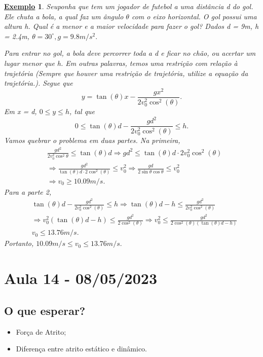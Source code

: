 \documentclass{article}
\newtheorem{example}{\underline{Exemplo}}
\begin{document}
\begin{example}
  Seuponha que tem um jogador de futebol a uma dist\^ancia d do gol. Ele chuta a bola, a qual faz um \^angulo $\theta $ com o 
eixo horizontal. O gol possui uma altura h. Qual \'e a menor e a maior velocidade para fazer o gol? Dados d = 9m, h = 2.4m, $\theta =30^{\circ}, g=9.8m/s^{2}.$

  Para entrar no gol, a bola deve percorrer toda a d e ficar no ch\~ao, ou acertar um lugar menor que h. Em outras palavras,
  temos uma restri\c c\~ao com rela\c c\~ao \`a trajet\'oria (Sempre que houver uma restri\c c\~ao de trajet\'oria, utilize a equa\c c\~ao da trajet\'oria.).
  Segue que 
    $$
    y = \tan{(\theta)}x - \frac{gx^{2}}{2v_{0}^{2}\cos^{2}{(\theta )}}.
    $$
  Em x = d, $0\leq y\leq h$, tal que 
    $$
    0\leq \tan{(\theta)}d - \frac{gd^{2}}{2v_{0}^{2}\cos^{2}{(\theta )}}\leq h.
    $$
  Vamos quebrar o problema em duas partes. Na primeira, 
 \begin{align*}
   &\frac{gd^{2}}{2v_{0}^{2}\cos^{2}{\theta }}\leq \tan{(\theta )}d \Rightarrow gd^{2}\leq \tan{(\theta )}d \cdot 2v_{0}^{2}\cos^{2}{(\theta)}\\
   & \Rightarrow \frac{gd^{2}}{\tan{(\theta )}d \cdot 2\cos^{2}{(\theta )}}\leq v_{0}^{2} \Rightarrow  \frac{gd}{2\sin{\theta }\cos{\theta }}\leq v_{0}^{2}\\
   & \Rightarrow v_{0}\geq 10.09m/s.
 \end{align*}  
 Para a parte 2,
 \begin{align*}
   &\tan{(\theta )}d - \frac{gd^{2}}{2v_{0}^{2}\cos^{2}{(\theta )}}\leq  h \Rightarrow \tan{(\theta )}d - h\leq \frac{gd^{2}}{2v_{0}^{2}\cos^{2}{(\theta )}}\\
   & \Rightarrow v_{0}^{2}(\tan{(\theta )}d - h)\leq \frac{gd^{2}}{2\cos^{2}{(\theta )}} \Rightarrow  v_{0}^{2}\leq \frac{gd^{2}}{2\cos^{2}{(\theta )}(\tan{(\theta )}d-h)}\\
   & v_{0}\leq 13.76m/s.
 \end{align*}
 Portanto, $10.09m/s\leq v_{0}\leq 13.76m/s.$
\end{example}
\newpage

\section{Aula 14 - 08/05/2023}
\subsection{O que esperar?}
\begin{itemize}
  \item Força de Atrito;
  \item Diferença entre atrito estático e dinâmico.
\end{itemize}
\end{document}
